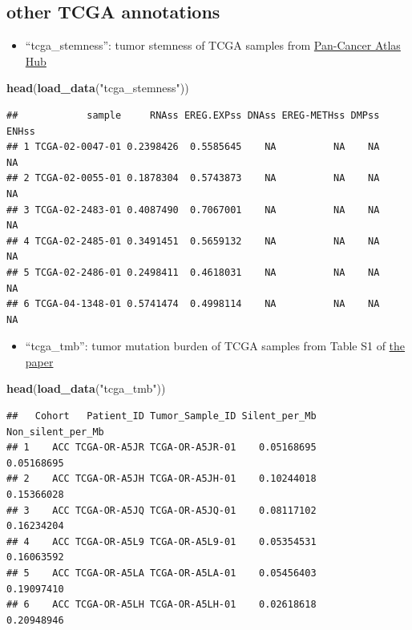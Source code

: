 \documentclass[
]{book}
\newenvironment{Shaded}{\begin{snugshade}}{\end{snugshade}}
\newcommand{\FunctionTok}[1]{\textcolor[rgb]{0.13,0.29,0.53}{\textbf{#1}}}
\newcommand{\NormalTok}[1]{#1}
\newcommand{\StringTok}[1]{\textcolor[rgb]{0.31,0.60,0.02}{#1}}
\providecommand{\tightlist}{%
  \setlength{\itemsep}{0pt}\setlength{\parskip}{0pt}}
\begin{document}
\subsection{other TCGA annotations}\label{other-tcga-annotations}

\begin{itemize}
\tightlist
\item
  ``tcga\_stemness'': tumor stemness of TCGA samples from \href{https://xenabrowser.net/datapages/?host=https\%3A\%2F\%2Fpancanatlas.xenahubs.net&removeHub=https\%3A\%2F\%2Fxena.treehouse.gi.ucsc.edu\%3A443}{Pan-Cancer Atlas Hub}
\end{itemize}

\begin{Shaded}
\begin{Highlighting}[]
\FunctionTok{head}\NormalTok{(}\FunctionTok{load\_data}\NormalTok{(}\StringTok{"tcga\_stemness"}\NormalTok{))}
\end{Highlighting}
\end{Shaded}

\begin{verbatim}
##            sample     RNAss EREG.EXPss DNAss EREG-METHss DMPss ENHss
## 1 TCGA-02-0047-01 0.2398426  0.5585645    NA          NA    NA    NA
## 2 TCGA-02-0055-01 0.1878304  0.5743873    NA          NA    NA    NA
## 3 TCGA-02-2483-01 0.4087490  0.7067001    NA          NA    NA    NA
## 4 TCGA-02-2485-01 0.3491451  0.5659132    NA          NA    NA    NA
## 5 TCGA-02-2486-01 0.2498411  0.4618031    NA          NA    NA    NA
## 6 TCGA-04-1348-01 0.5741474  0.4998114    NA          NA    NA    NA
\end{verbatim}

\begin{itemize}
\tightlist
\item
  ``tcga\_tmb'': tumor mutation burden of TCGA samples from Table S1 of \href{https://doi.org/10.1016/j.immuni.2018.03.023}{the paper}
\end{itemize}

\begin{Shaded}
\begin{Highlighting}[]
\FunctionTok{head}\NormalTok{(}\FunctionTok{load\_data}\NormalTok{(}\StringTok{"tcga\_tmb"}\NormalTok{))}
\end{Highlighting}
\end{Shaded}

\begin{verbatim}
##   Cohort   Patient_ID Tumor_Sample_ID Silent_per_Mb Non_silent_per_Mb
## 1    ACC TCGA-OR-A5JR TCGA-OR-A5JR-01    0.05168695        0.05168695
## 2    ACC TCGA-OR-A5JH TCGA-OR-A5JH-01    0.10244018        0.15366028
## 3    ACC TCGA-OR-A5JQ TCGA-OR-A5JQ-01    0.08117102        0.16234204
## 4    ACC TCGA-OR-A5L9 TCGA-OR-A5L9-01    0.05354531        0.16063592
## 5    ACC TCGA-OR-A5LA TCGA-OR-A5LA-01    0.05456403        0.19097410
## 6    ACC TCGA-OR-A5LH TCGA-OR-A5LH-01    0.02618618        0.20948946
\end{verbatim}
\end{document}
